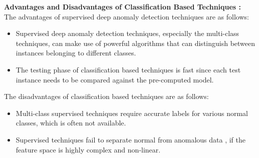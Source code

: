 \textbf{Advantages and Disadvantages of Classification Based Techniques :}\\
The advantages of supervised deep anomaly detection techniques are as follows:
\begin{itemize}
\item Supervised deep anomaly detection techniques, especially the multi-class techniques, can make
use of powerful algorithms that can distinguish between instances belonging to
different classes.\\
\item The testing phase of classification based techniques is fast since each test instance
needs to be compared against the pre-computed model.
\end{itemize}
The disadvantages of classification based techniques are as follows:
\begin{itemize}
\item  Multi-class supervised techniques require accurate labels for various normal classes, which is often not available.
\item Supervised techniques fail to separate normal from anomalous data , if the feature space is highly complex and non-linear.
\end{itemize}












